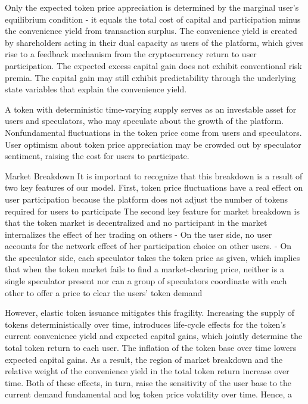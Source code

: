 Only the expected token price appreciation is determined by the marginal user's equilibrium condition - it equals the total cost of capital and participation minus the convenience yield from transaction surplus.  The convenience yield is created by shareholders acting in their dual capacity as users of the platform, which gives rise to a feedback mechanism from the cryptocurrency return to user participation. The expected excess capital gain does not exhibit conventional risk premia. The capital gain may still exhibit predictability through the underlying state variables that explain the convenience yield. 

A token with deterministic time-varying supply serves as an investable asset for users and speculators, who may speculate about the growth of the platform. Nonfundamental fluctuations in the token price come from users and speculators. User optimism about token price appreciation may be crowded out by speculator sentiment, raising the cost for users to participate. 

Market Breakdown
It is important to recognize that this breakdown is a result of two key features of our model. First, token price fluctuations have a real effect on user participation because the platform does not adjust the number of tokens required for users to participate
The second key feature for market breakdown is that the token market is decentralized and no participant in the market internalizes the effect of her trading on others
  - On the user side, no user accounts for the network effect of her participation choice on other users. 
  - On the speculator side, each speculator takes the token price as given, which implies that when the token market fails to find a market-clearing price, neither is a single speculator present nor can a group of speculators coordinate with each other to offer a price to clear the users' token demand

However, elastic token issuance mitigates this fragility. Increasing the supply of tokens deterministically over time, introduces life-cycle effects for the token's current convenience yield and expected capital gains, which jointly determine the total token return to each user. The inflation of the token base over time lowers expected capital gains. As a result, the region of market breakdown and the relative weight of the convenience yield in the total token return increase over time. Both of these effects, in turn, raise the sensitivity of the user base to the current demand fundamental and log token price volatility over time. Hence, a

